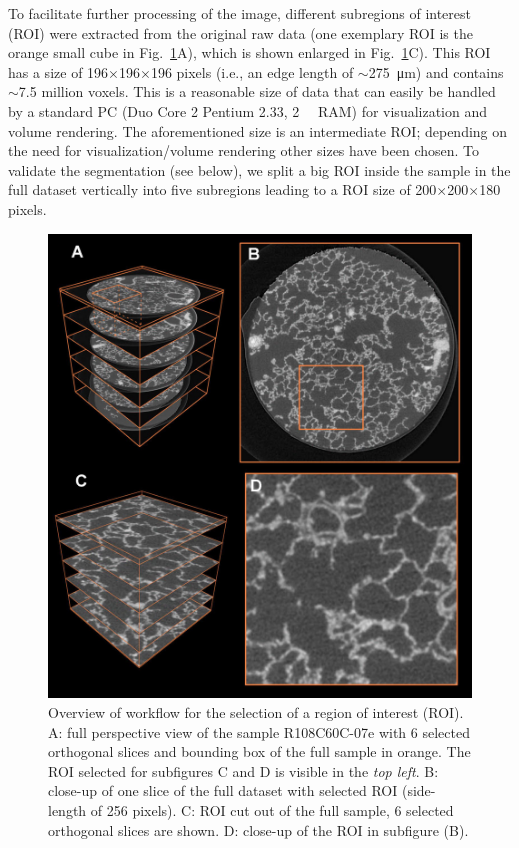 To facilitate further processing of the image, different subregions of interest (ROI) were extracted from the original raw data (one exemplary ROI is the orange small cube in Fig.~\ref{fig:srxtm}A), which is shown enlarged in Fig.~\ref{fig:srxtm}C). This ROI has a size of 196$\times$196$\times$196 pixels (i.e., an edge length of $\sim$\SI{275}{\micro\meter}) and contains $\sim$7.5 million voxels. This is a reasonable size of data that can easily be handled by a standard PC (Duo Core 2 Pentium \SI{2.33}{\gigahertz}, \SI{2}{\giga\byte} RAM) for visualization and volume rendering. The aforementioned size is an intermediate ROI; depending on the need for visualization/volume rendering other sizes have been chosen. To validate the segmentation (see below), we split a big ROI inside the sample in the full dataset vertically into five subregions leading to a ROI size of 200$\times$200$\times$180 pixels.

\renewcommand{\imsize}{\linewidth}
\begin{figure}[p]
	\centering
	\includegraphics[width=\imsize]{img/Tsuda2008/Tsuda-05}
	\caption[Overview of workflow for the selection of a region of interest]{Overview of workflow for the selection of a region of interest (ROI). A: full perspective view of the sample R108C60C-07e with 6 selected orthogonal slices and
bounding box of the full sample in orange. The ROI selected for subfigures C and D is
visible in the \textit{top left}. B: close-up of one slice of the full dataset with selected ROI (side-length of 256 pixels). C: ROI cut out of the full sample, 6 selected orthogonal slices are shown. D: close-up of the ROI in subfigure (B).}
	\label{fig:srxtm}
\end{figure}


